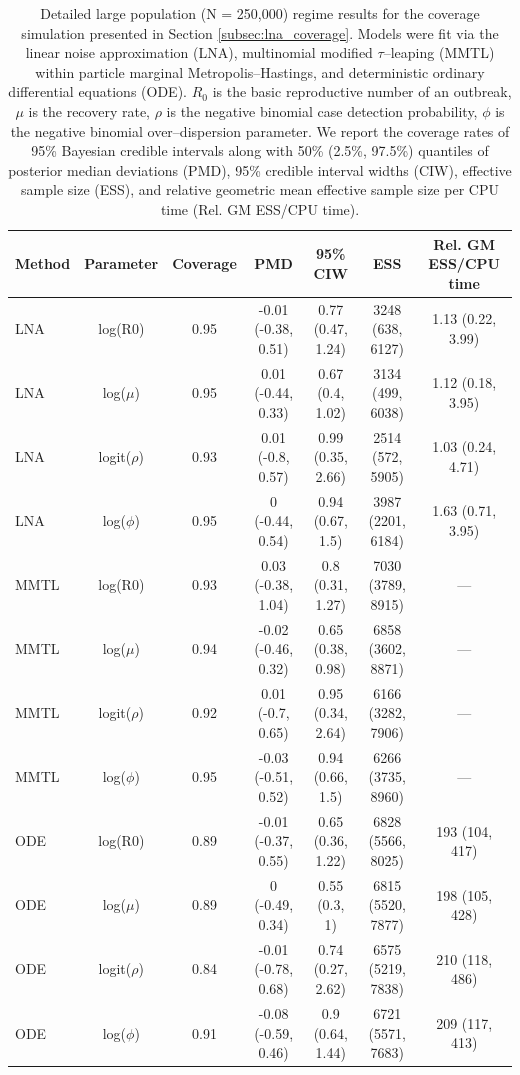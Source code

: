 \begin{table}
	\begin{fullpage}
		\small
		\centering
		\begin{tabular}{lcccccc}
			\hline
			Method & Parameter & Coverage & PMD & 95\% CIW & ESS & Rel. GM ESS/CPU time \\ 
			\hline
			LNA & log(R0) & 0.95 & -0.01 (-0.38, 0.51) & 0.77 (0.47, 1.24) & 3248 (638, 6127) & 1.13 (0.22, 3.99) \\ 
			LNA & log($\mu$) & 0.95 & 0.01 (-0.44, 0.33) & 0.67 (0.4, 1.02) & 3134 (499, 6038) & 1.12 (0.18, 3.95) \\ 
			LNA & logit($\rho$) & 0.93 & 0.01 (-0.8, 0.57) & 0.99 (0.35, 2.66) & 2514 (572, 5905) & 1.03 (0.24, 4.71) \\ 
			LNA & log($\phi$) & 0.95 & 0 (-0.44, 0.54) & 0.94 (0.67, 1.5) & 3987 (2201, 6184) & 1.63 (0.71, 3.95) \\ 
			MMTL & log(R0) & 0.93 & 0.03 (-0.38, 1.04) & 0.8 (0.31, 1.27) & 7030 (3789, 8915) & --- \\ 
			MMTL & log($\mu$) & 0.94 & -0.02 (-0.46, 0.32) & 0.65 (0.38, 0.98) & 6858 (3602, 8871) & --- \\ 
			MMTL & logit($\rho$) & 0.92 & 0.01 (-0.7, 0.65) & 0.95 (0.34, 2.64) & 6166 (3282, 7906) & --- \\ 
			MMTL & log($\phi$) & 0.95 & -0.03 (-0.51, 0.52) & 0.94 (0.66, 1.5) & 6266 (3735, 8960) & --- \\ 
			ODE & log(R0) & 0.89 & -0.01 (-0.37, 0.55) & 0.65 (0.36, 1.22) & 6828 (5566, 8025) & 193 (104, 417) \\ 
			ODE & log($\mu$) & 0.89 & 0 (-0.49, 0.34) & 0.55 (0.3, 1) & 6815 (5520, 7877) & 198 (105, 428) \\ 
			ODE & logit($\rho$) & 0.84 & -0.01 (-0.78, 0.68) & 0.74 (0.27, 2.62) & 6575 (5219, 7838) & 210 (118, 486) \\ 
			ODE & log($\phi$) & 0.91 & -0.08 (-0.59, 0.46) & 0.9 (0.64, 1.44) & 6721 (5571, 7683) & 209 (117, 413) \\ 
			\hline
		\end{tabular}
		\caption[Large population coverage results for SIR models fit via the LNA, ODE, and MMTL approximations.]{Detailed large population (N = 250,000) regime results for the coverage simulation presented in Section \ref{subsec:lna_coverage}. Models were fit via the linear noise approximation (LNA), multinomial modified $ \tau $--leaping (MMTL) within particle marginal Metropolis--Hastings, and deterministic ordinary differential equations (ODE). $ R_0 $ is the basic reproductive number of an outbreak, $ \mu $ is the recovery rate, $ \rho $ is the negative binomial case detection probability, $ \phi $ is the negative binomial over--dispersion parameter. We report the coverage rates of 95\% Bayesian credible intervals along with 50\% (2.5\%, 97.5\%) quantiles of posterior median deviations (PMD), 95\% credible interval widths (CIW), effective sample size (ESS), and relative geometric mean effective sample size per CPU time (Rel. GM ESS/CPU time).}
	\end{fullpage}
\end{table}	

